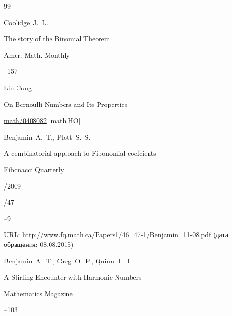 \begin{thebibliography}{99}




\by Coolidge~J.~L. 

\paper  The story of the Binomial Theorem 

\jour Amer. Math. Monthly 



--157






\by  Lin Cong

\preprint On Bernoulli Numbers and Its Properties

\arxiv \href{http://arxiv.org/abs/math/0408082}{math/0408082} [math.HO]






\by Benjamin~A.~T., Plott~S.~S.

\paper A combinatorial approach to Fibonomial coefcients

\jour Fibonacci Quarterly

/2009

/47


--9

\elink URL: \url{http://www.fq.math.ca/Papers1/46_47-1/Benjamin_11-08.pdf} \Russian (дата обращения: 08.08.2015)




\by Benjamin~A.~T., Greg~O.~P., Quinn~J.~J.

\paper A Stirling Encounter with Harmonic Numbers

\jour Mathematics Magazine




--103






\end{thebibliography}
